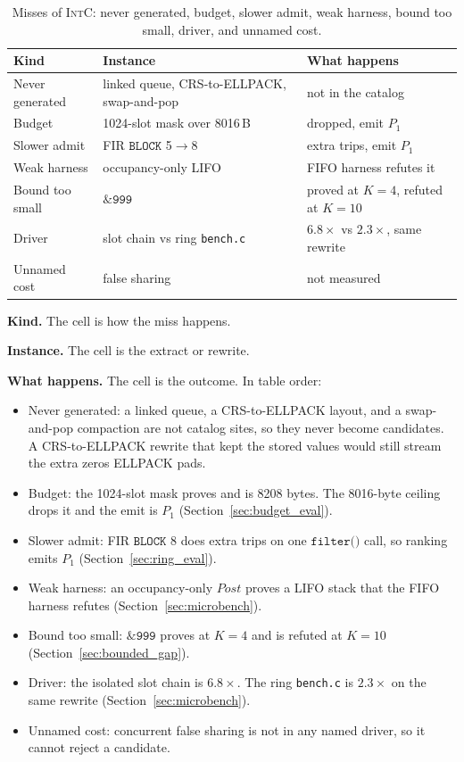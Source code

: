 \begin{table}
\caption{Misses of \textsc{IntC}: never generated, budget, slower
admit, weak harness, bound too small, driver, and unnamed cost.}
\label{tab:failures}
\begin{center}
\scriptsize
\begin{tabular}{llp{}}
\toprule
Kind & Instance & What happens \\
\midrule
Never generated & linked queue, CRS-to-ELLPACK, swap-and-pop & not in the catalog \\
Budget & 1024-slot mask over 8016\,B & dropped, emit \(P_1\) \\
Slower admit & FIR \(\texttt{BLOCK}\) 5\(\to\)8 & extra trips, emit \(P_1\) \\
Weak harness & occupancy-only LIFO & FIFO harness refutes it \\
Bound too small & \(\texttt{\& 999}\) & proved at \(K=4\), refuted at \(K=10\) \\
Driver & slot chain vs ring \texttt{bench.c} & \(6.8\times\) vs \(2.3\times\), same rewrite \\
Unnamed cost & false sharing & not measured \\
\bottomrule
\end{tabular}
\end{center}
\end{table}

\textbf{Kind.} The cell is how the miss happens.

\textbf{Instance.} The cell is the extract or rewrite.

\textbf{What happens.} The cell is the outcome. In table order:
\begin{itemize}
  \item Never generated: a linked queue, a CRS-to-ELLPACK layout, and a
  swap-and-pop compaction are not catalog sites, so they never become
  candidates. A CRS-to-ELLPACK rewrite that kept the stored values would
  still stream the extra zeros ELLPACK pads.
  \item Budget: the 1024-slot mask proves and is 8208 bytes. The 8016-byte
  ceiling drops it and the emit is \(P_1\)
  (Section~\ref{sec:budget_eval}).
  \item Slower admit: FIR \(\texttt{BLOCK}\) 8 does extra trips on one
  \(\texttt{filter()}\) call, so ranking emits \(P_1\)
  (Section~\ref{sec:ring_eval}).
  \item Weak harness: an occupancy-only \(\mathit{Post}\) proves a LIFO
  stack that the FIFO harness refutes
  (Section~\ref{sec:microbench}).
  \item Bound too small: \(\texttt{\& 999}\) proves at \(K=4\) and is
  refuted at \(K=10\) (Section~\ref{sec:bounded_gap}).
  \item Driver: the isolated slot chain is \(6.8\times\). The ring
  \texttt{bench.c} is \(2.3\times\) on the same rewrite
  (Section~\ref{sec:microbench}).
  \item Unnamed cost: concurrent false sharing is not in any named
  driver, so it cannot reject a candidate.
\end{itemize}
